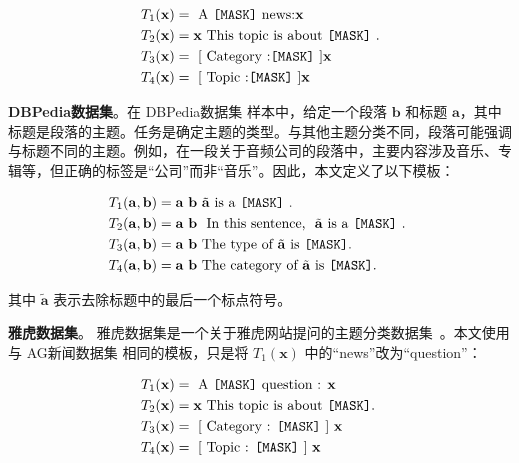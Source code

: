 {\centering
\begin{mybox}
\begin{align*}
 T_1(\mathbf{x}) &= \text{ A \texttt{[MASK]} news:} \mathbf{x} \\
 T_2(\mathbf{x}) &= \mathbf{x} \text{ This topic is about \texttt{[MASK]} .}\\
  T_3(\mathbf{x}) &=  \text{ [ Category :\texttt{[MASK]} ]} \mathbf{x}\\
  T_4(\mathbf{x}) &=  \text{ [ Topic :\texttt{[MASK]} ]} \mathbf{x}
\end{align*}
\end{mybox}
}

\textbf{DBPedia数据集}。在 DBPedia数据集 样本中，给定一个段落 $\mathbf{b}$ 和标题 $\mathbf{a}$，其中标题是段落的主题。任务是确定主题的类型。与其他主题分类不同，段落可能强调与标题不同的主题。例如，在一段关于音频公司的段落中，主要内容涉及音乐、专辑等，但正确的标签是“公司”而非“音乐”。因此，本文定义了以下模板：

{\centering
\begin{mybox2}
\begin{align*}
     T_1(\mathbf{a},\mathbf{b}) &=  \mathbf{a} \ \mathbf{b}  \  \tilde{\mathbf{a}}  \text{ is a \texttt{[MASK]} . }\\
      T_2(\mathbf{a},\mathbf{b}) &=  \mathbf{a} \   \mathbf{b}  \  \text{ In this sentence, } \  \tilde{\mathbf{a}}  \text{ is a \texttt{[MASK]} . } \\
   T_3(\mathbf{a},\mathbf{b}) &=   \mathbf{a}\ \mathbf{b} \  \text{The type of}\  \tilde{\mathbf{a}} \ \text{is}\  \texttt{[MASK]} .\\
   T_4(\mathbf{a},\mathbf{b}) &=\mathbf{a}\ \mathbf{b} \ \text{The category of}\  \tilde{\mathbf{a}} \ \text{is}\ \texttt{[MASK]} .
\end{align*}
\end{mybox2}
}
其中 $\tilde{\mathbf{a}}$ 表示去除标题中的最后一个标点符号。

\textbf{雅虎数据集}。 雅虎数据集是一个关于雅虎网站提问的主题分类数据集~\cite{zhang2015character}。本文使用与 AG新闻数据集 相同的模板，只是将 $T_1(\mathbf{x})$ 中的“news”改为“question”：

{\centering
\begin{mybox}
\begin{align*}
     T_1(\mathbf{x})  &= \text{ A \texttt{[MASK]} question : }  \mathbf{x}  \\
     T_2(\mathbf{x})  &= \mathbf{x} \text{ This topic is about \texttt{[MASK]}. }\\
     T_3(\mathbf{x})   &= \text{ [ Category : \texttt{[MASK]} ] }  \mathbf{x}  \\
     T_4(\mathbf{x})   &=\text{ [ Topic : \texttt{[MASK]} ] } \mathbf{x} 
\end{align*}
\end{mybox}
}

